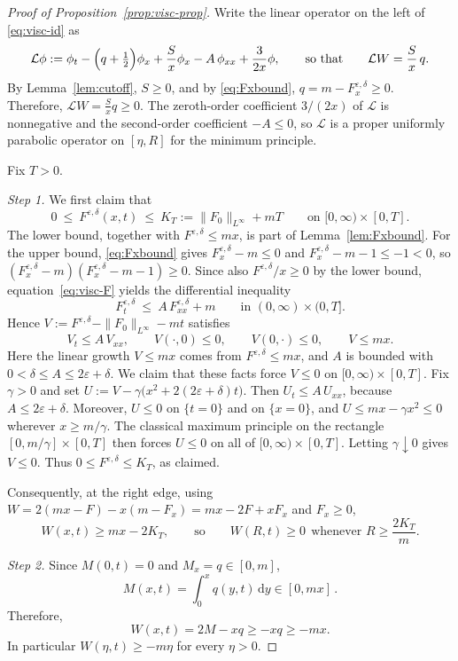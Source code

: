 \documentclass[12pt]{amsart}
\numberwithin{equation}{section}
\theoremstyle{plain}
\theoremstyle{definition}
\newcommand{\dd}{\,\mathrm{d}}
\newcommand{\eps}{\varepsilon}
\newcommand{\Lop}{\mathcal{L}}
\begin{document}
\begin{proof}[Proof of Proposition~\ref{prop:visc-prop}]
	Write the linear operator on the left of \eqref{eq:visc-id} as
	\[
		\Lop\phi:=\phi_t-\Bigl(q+\tfrac12\Bigr)\phi_x+\frac{S}{x}\phi_x
		-A\,\phi_{xx}+\frac{3}{2x}\phi,
		\qquad\text{so that}\qquad \Lop W=\frac{S}{x}\,q .
	\]
	By Lemma~\ref{lem:cutoff}, $S\ge0$, and by \eqref{eq:Fxbound},
	$q=m-F^{\eps,\delta}_x\ge0$.
	Therefore, $\Lop W=\tfrac{S}{x}q\ge0$. The zeroth-order coefficient
	$3/(2x)$ of $\Lop$
	is nonnegative and the second-order coefficient $-A\le0$, so $\Lop$
	is a proper
	uniformly parabolic operator on $[\eta,R]$  for the minimum principle.

	Fix $T>0$.

	\emph{Step 1.}
	We first claim that
	\[
		0\ \le\ F^{\eps,\delta}(x,t)\ \le\ K_T:=\|F_0\|_{L^\infty}+mT
		\qquad\text{on }[0,\infty)\times[0,T] .
			\]
			The lower bound, together with $F^{\eps,\delta}\le mx$, is part of
			Lemma~\ref{lem:Fxbound}.
			For the upper bound, \eqref{eq:Fxbound} gives $F^{\eps,\delta}_x-m\le0$ and
			$F^{\eps,\delta}_x-m-1\le-1<0$, so
			$(F^{\eps,\delta}_x-m)(F^{\eps,\delta}_x-m-1)\ge0$. Since also
			$F^{\eps,\delta}/x\ge0$ by the lower bound, equation~\eqref{eq:visc-F} yields
			the differential inequality
			\[
			F^{\eps,\delta}_t\ \le\ A\,F^{\eps,\delta}_{xx}+m
			\qquad\text{in }(0,\infty)\times(0,T] .
	\]
	Hence $V:=F^{\eps,\delta}-\|F_0\|_{L^\infty}-mt$ satisfies
	\[
		V_t\le A\,V_{xx},\qquad
		V(\cdot,0)\le0,\qquad V(0,\cdot)\le0,\qquad V\le mx .
	\]
	Here the linear growth $V\le mx$ comes from $F^{\eps,\delta}\le mx$, and $A$
	is bounded with $0<\delta\le A\le2\eps+\delta$. We claim that these facts
	force $V\le0$ on $[0,\infty)\times[0,T]$. Fix $\gamma>0$ and set
	$U:=V-\gamma\bigl(x^{2}+2(2\eps+\delta)t\bigr)$. Then $U_t\le A\,U_{xx}$,
	because $A\le2\eps+\delta$. Moreover, $U\le0$ on $\{t=0\}$ and on $\{x=0\}$,
	and $U\le mx-\gamma x^{2}\le0$ wherever $x\ge m/\gamma$. The classical
	maximum principle on the rectangle $[0,m/\gamma]\times[0,T]$ then forces
	$U\le0$ on all of $[0,\infty)\times[0,T]$. Letting $\gamma\downarrow0$ gives
	$V\le0$. Thus $0\le F^{\eps,\delta}\le K_T$, as claimed.

	Consequently, at the right edge, using
	$W=2(mx-F)-x(m-F_x)=mx-2F+xF_x$ and $F_x\ge0$,
	\[
		W(x,t)\ge mx-2K_T,
		\qquad\text{so}\qquad W(R,t)\ge0\ \ \text{whenever }R\ge\frac{2K_T}{m}.
	\]

	\emph{Step 2.} Since $M(0,t)=0$ and $M_x=q\in[0,m]$,
	\[
		M(x,t)=\int_0^x q(y,t)\dd y\in[0,mx] \,.
	\]
	Therefore,
	\begin{equation*}
		W(x,t)=2M-xq\ge-xq\ge-mx .
	\end{equation*}
	In particular $W(\eta,t)\ge-m\eta$ for every $\eta>0$.


\end{proof}
\end{document}
